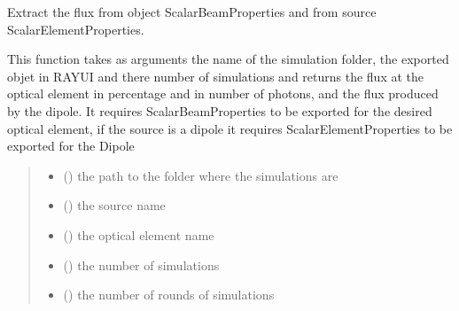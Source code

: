 \documentclass[letterpaper,10pt,english]{sphinxmanual}
\begin{document}
\begin{fulllineitems}
\begin{fulllineitems}
\label{\detokenize{code_documentation:raypyng.postprocessing.PostProcessAnalyzed.retrieve_flux_beamline}}
\pysigstartsignatures
{}
\pysigstopsignatures
\sphinxAtStartPar
Extract the flux from object ScalarBeamProperties and from source ScalarElementProperties.

\sphinxAtStartPar
This function takes as arguments the name of the
simulation folder, the exported objet in RAY\sphinxhyphen{}UI and there
number of simulations and returns the flux at the optical element in
percentage and in number of photons, and the flux produced
by the dipole.
It requires ScalarBeamProperties to be exported for the desired optical element,
if the source is a dipole it requires ScalarElementProperties to be exported for the Dipole
\begin{quote}\begin{description}
\begin{itemize}
\item {} 
\sphinxAtStartPar
{} () \textendash{} the path to the folder where the simulations are

\item {} 
\sphinxAtStartPar
{} () \textendash{} the source name

\item {} 
\sphinxAtStartPar
{} () \textendash{} the optical element name

\item {} 
\sphinxAtStartPar
{} () \textendash{} the number of simulations

\item {} 
\sphinxAtStartPar
{} () \textendash{} the number of rounds of simulations


\end{itemize}
\end{description}
\end{quote}
\end{fulllineitems}
\end{fulllineitems}
\end{document}
